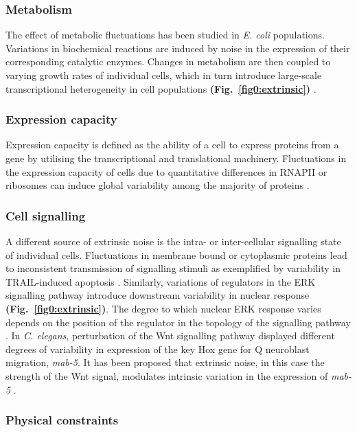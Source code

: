 \subsubsection{Metabolism}

The effect of metabolic fluctuations has been studied in \textit{E. coli} populations. Variations in biochemical reactions are induced by noise in the expression of their corresponding catalytic enzymes. 
Changes in metabolism are then coupled to varying growth rates of individual cells, which in turn introduce large-scale transcriptional heterogeneity in cell populations \textbf{(Fig.~\ref{fig0:extrinsic})} \citep{Kiviet2014}.  

\subsubsection{Expression capacity}

Expression capacity is defined as the ability of a cell to express proteins from a gene by utilising the transcriptional and translational machinery. 
Fluctuations in the expression capacity of cells due to quantitative differences in RNAPII or ribosomes can induce global variability among the majority of proteins \citep{Colman-Lerner2005}.

\subsubsection{Cell signalling}

A different source of extrinsic noise is the intra- or inter-cellular signalling state of individual cells. 
Fluctuations in membrane bound or cytoplasmic proteins lead to inconsistent transmission of signalling stimuli as exemplified by variability in \gls{TRAIL}-induced apoptosis \citep{Spencer2009}. 
Similarly, variations of regulators in the \gls{ERK} signalling pathway introduce downstream variability in nuclear response \textbf{(Fig.~\ref{fig0:extrinsic})}. 
The degree to which nuclear ERK response varies depends on the position of the regulator in the topology of the signalling pathway \citep{Iwamoto2016}. 
In \textit{C. elegans}, perturbation of the Wnt signalling pathway displayed different degrees of variability in expression of the key Hox gene for Q neuroblast migration, \textit{mab-5}. 
It has been proposed that extrinsic noise, in this case the strength of the Wnt signal, modulates intrinsic variation in the expression of \textit{mab-5} \citep{Ji2013}. 

\subsubsection{Physical constraints}

